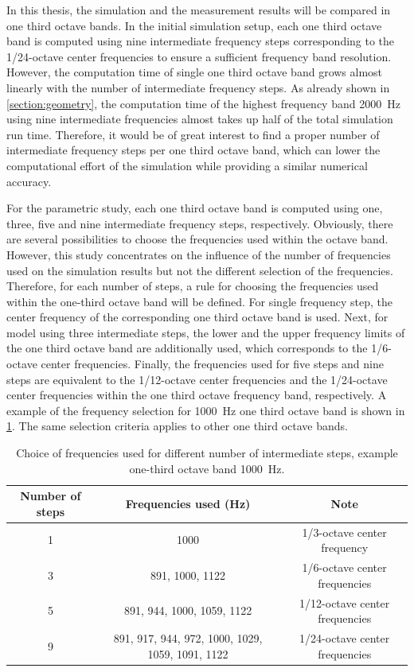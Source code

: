 In this thesis, the simulation and the measurement results will be compared in one third octave bands.
In the initial simulation setup, each one third octave band is computed using nine intermediate frequency steps corresponding to the 1/24-octave center frequencies to ensure a sufficient frequency band resolution.
However, the computation time of single one third octave band grows almost linearly with the number of intermediate frequency steps.
As already shown in \cref{section:geometry}, the computation time of the highest frequency band \SI{2000}{Hz} using nine intermediate frequencies almost takes up half of the total simulation run time.
Therefore, it would be of great interest to find a proper number of intermediate frequency steps per one third octave band, which can lower the computational effort of the simulation while providing a similar numerical accuracy.

For the parametric study, each one third octave band is computed using one, three, five and nine intermediate frequency steps, respectively. Obviously, there are several possibilities to choose the frequencies used within the octave band. However, this study concentrates on the influence of the number of frequencies used on the simulation results but not the different selection of the frequencies. Therefore, for each number of steps, a rule for choosing the frequencies used within the one-third octave band will be defined. For single frequency step, the center frequency of the corresponding one third octave band is used. Next, for model using three intermediate steps, the lower and the upper frequency limits of the one third octave band are additionally used, which corresponds to the 1/6-octave center frequencies. Finally, the frequencies used for five steps and nine steps are equivalent to the 1/12-octave center frequencies and the 1/24-octave center frequencies within the one third octave frequency band, respectively. A example of the frequency selection for \SI{1000}{\hertz} one third octave band is shown in \cref{tab:variation_freq_steps}. The same selection criteria applies to other one third octave bands.

\begin{table}[H]
	\caption{Choice of frequencies used for different number of intermediate steps, example one-third octave band \SI{1000}{\hertz}.}
	\centering
	\begin{tabular}{ccc}
		\toprule
		Number of steps    &  Frequencies used (Hz) & Note  \\
		\midrule
		1    &  1000  & 1/3-octave center frequency\\
		3  	 &  891, 1000, 1122 & 1/6-octave center frequencies \\
		5  	 &  891, 944, 1000, 1059, 1122 & 1/12-octave center frequencies\\
		9    &  891, 917, 944, 972, 1000, 1029, 1059, 1091, 1122 & 1/24-octave center frequencies \\
		\bottomrule
	\end{tabular}
	\label{tab:variation_freq_steps}
\end{table}